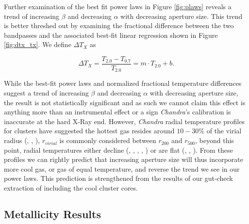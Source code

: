 \documentclass[12pt, preprint]{aastex}
\begin{document}
Further examination of the best fit power laws in Figure
\ref{fig:plaws} reveals a trend of increasing $\beta$ and decreasing
$\alpha$ with decreasing aperture size. This trend is better threshed
out by examining the fractional difference between the two bandpasses
and the associated best-fit linear regression shown in Figure
\ref{fig:dtx_tx}. We define $\Delta T_{X}$ as

\begin{equation}
\Delta T_{X} = \frac{T_{2.0}-T_{0.7}}{T_{2.0}} = m \cdot T_{2.0} + b.
\end{equation}

While the best-fit power laws and normalized fractional temperature
differences suggest a trend of increasing $\beta$
and decreasing $\alpha$ with decreasing aperture size, the result is
not statistically significant and as such we cannot claim this effect
is anything more than an instrumental effect or a sign
{\textit{Chandra}}'s calibration is inaccurate at the hard X-Ray
end. However, {\textit{Chandra}} radial temperature profiles for
clusters have suggested the hottest gas resides around $10-30\%$ of
the virial radius (\cite{2006MNRAS.tmp.1068S}, \cite{2004ApJ...610..762H},
\cite{2004ApJ...604..604O}), $r_{virial}$ is commonly considered between
$r_{200}$ and $r_{500}$, beyond this point, radial temperatures either
decline (\cite{2006ApJ...641..752K}, \cite{2005ApJ...628..655V}, \cite{2005A&A...433..101P},
\cite{2002A&A...394..375P}, \cite{2002ApJ...577..701H}) or are flat
(\cite{2006ApJ...643..751C}, \cite{2005A&A...429..791P},
\cite{2004A&A...423...33P}). From these profiles we can rightly
predict that increasing aperture size will thus incorporate more cool
gas, or gas of equal temperature, and reverse the trend we see in our
power laws. This prediction is strengthened from the results of our
gut-check extraction of including the cool cluster cores.


\subsection{Metallicity Results} \label{sec:zspecresults}
\end{document}
